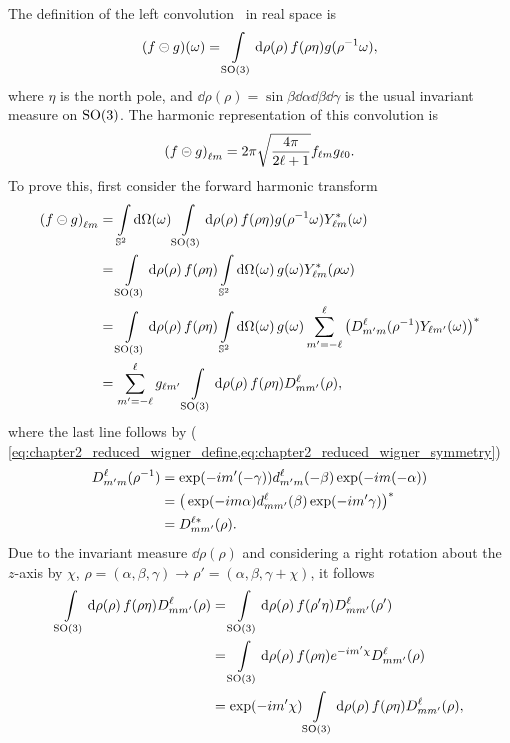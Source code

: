 The definition of the left convolution~\cite{Kennedy2011,Driscoll1994} in real space is
%
\begin{equation}
	\pixel{(f \circleddash g)}
	= \integrateRotation{\rho} f(\rho\eta) g(\rho^{-1}\omega),
\end{equation}
%
where \({\eta}\) is the north pole, and \(\dd{\rho(\rho)}=\sin{\beta} \dd{\alpha} \dd{\beta} \dd{\gamma}\) is the usual invariant measure on \(\rotationGroup{}\).
The harmonic representation of this convolution is
%
\begin{equation}
	\harmonic{(f \circleddash g)}
	= 2\pi \sqrt{\inverseFactor} \harmonic{f} \axiHarmonic{g}.
\end{equation}
%
To prove this, first consider the forward harmonic transform
%
\begin{align}
	\harmonic{(f \circleddash g)}
	 & = \integrateSphere{\omega} \integrateRotation{\rho} f(\rho\eta) g(\rho^{-1}\omega) \pixel{\conj{\harmonic{Y}}} \nonumber{}                                                                 \\
	 & = \integrateRotation{\rho} f(\rho\eta) \integrateSphere{\omega} \pixel{g} \conj{\harmonic{Y}}(\rho\omega) \nonumber{}                                                                      \\
	 & = \integrateRotation{\rho} f(\rho\eta) \integrateSphere{\omega} \pixel{g} \sum\limits_{m'=-\ell}^{\ell} \conj{\big( \wigner{\ell}{m'}{m}(\rho^{-1}) \pixel{Y_{\ell m'}} \big)} \nonumber{} \\
	 & = \sum\limits_{m'=-\ell}^{\ell} g_{\ell m'} \integrateRotation{\rho} f(\rho\eta) \wigner{\ell}{m}{m'}(\rho),
\end{align}
%
where the last line follows by (\cf{} \cref{eq:chapter2_reduced_wigner_define,eq:chapter2_reduced_wigner_symmetry})
%
\begin{align}
	\wigner{\ell}{m'}{m} (\rho^{-1})
	 & = \exp(-i m'(-\gamma)) \reducedWigner{\ell}{m'}{m}(-\beta) \exp(-i m(-\alpha)) \nonumber{}           \\
	 & = \conj{\big(\exp(-i m\alpha) \reducedWigner{\ell}{m}{m'}(\beta) \exp(-i m'\gamma)\big)} \nonumber{} \\
	 & = \wigner[\ast]{\ell}{m}{m'}(\rho).
\end{align}
%
Due to the invariant measure \(\dd{\rho(\rho)}\) and considering a right rotation about the \(z\)-axis by \({\chi}\), \ie{} \(\rho = (\alpha,\beta,\gamma) \rightarrow \rho' = (\alpha,\beta,\gamma+\chi)\), it follows
%
\begin{align}\label{eq:chapter2_so3_integral}
	\integrateRotation{\rho} f(\rho\eta) \wigner{\ell}{m}{m'}(\rho)
	 & = \integrateRotation{\rho} f(\rho'\eta) \wigner{\ell}{m}{m'}(\rho') \nonumber{}             \\
	 & = \integrateRotation{\rho} f(\rho\eta) e^{-i m'\chi} \wigner{\ell}{m}{m'}(\rho) \nonumber{} \\
	 & = \exp(-i m'\chi) \integrateRotation{\rho} f(\rho\eta) \wigner{\ell}{m}{m'}(\rho),
\end{align}

